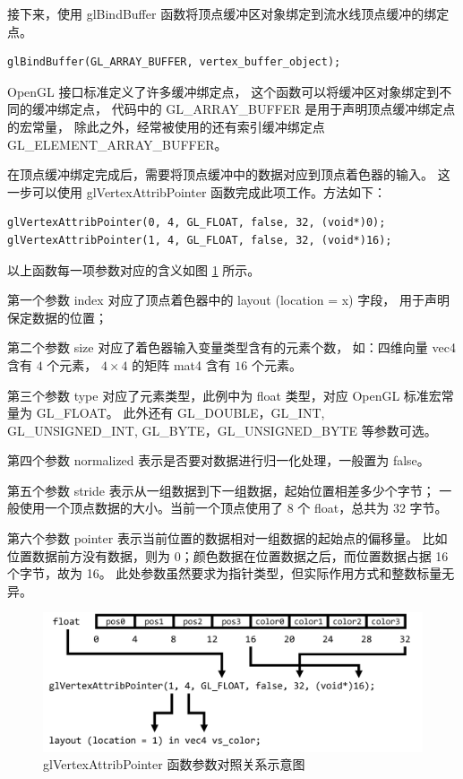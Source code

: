 \documentclass[fontset=windows]{ctexart}
\begin{document}
接下来，使用 glBindBuffer 函数将顶点缓冲区对象绑定到流水线顶点缓冲的绑定点。

\begin{lstlisting}
glBindBuffer(GL_ARRAY_BUFFER, vertex_buffer_object);
\end{lstlisting}

OpenGL 接口标准定义了许多缓冲绑定点，
这个函数可以将缓冲区对象绑定到不同的缓冲绑定点，
代码中的 GL\_ARRAY\_BUFFER 是用于声明顶点缓冲绑定点的宏常量，
除此之外，经常被使用的还有索引缓冲绑定点 GL\_ELEMENT\_ARRAY\_BUFFER。

在顶点缓冲绑定完成后，需要将顶点缓冲中的数据对应到顶点着色器的输入。
这一步可以使用 glVertexAttribPointer 函数完成此项工作。方法如下：

\begin{lstlisting}
glVertexAttribPointer(0, 4, GL_FLOAT, false, 32, (void*)0);
glVertexAttribPointer(1, 4, GL_FLOAT, false, 32, (void*)16);
\end{lstlisting}

以上函数每一项参数对应的含义如图 \ref{fig-gl:vertex-attrib} 所示。

第一个参数 index 对应了顶点着色器中的 layout (location = x) 字段，
用于声明保定数据的位置；

第二个参数 size 对应了着色器输入变量类型含有的元素个数，
如：四维向量 vec4 含有 $4$ 个元素，
$4\times 4$ 的矩阵 mat4 含有 $16$ 个元素。

第三个参数 type 对应了元素类型，此例中为 float 类型，对应 OpenGL 标准宏常量为 GL\_FLOAT。
此外还有 GL\_DOUBLE，GL\_INT, GL\_UNSIGNED\_INT, GL\_BYTE，GL\_UNSIGNED\_BYTE 等参数可选。

第四个参数 normalized 表示是否要对数据进行归一化处理，一般置为 false。

第五个参数 stride 表示从一组数据到下一组数据，起始位置相差多少个字节；
一般使用一个顶点数据的大小。当前一个顶点使用了 8 个 float，总共为 32 字节。

第六个参数 pointer 表示当前位置的数据相对一组数据的起始点的偏移量。
比如位置数据前方没有数据，则为 0；颜色数据在位置数据之后，而位置数据占据 16 个字节，故为 16。
此处参数虽然要求为指针类型，但实际作用方式和整数标量无异。

\begin{figure}[htbp]
\centering
\includegraphics[width=0.8\linewidth]{imgs/sec 3.3/vertex-attrib.png}
\caption{glVertexAttribPointer 函数参数对照关系示意图}
\label{fig-gl:vertex-attrib}
\end{figure}
\end{document}
